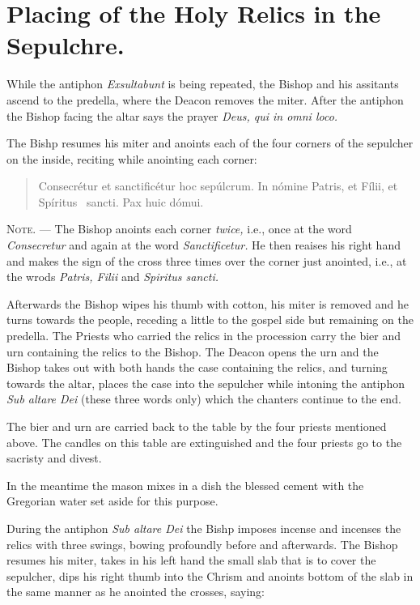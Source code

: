 \documentclass[letterpaper]{report}
\begin{document}
{\section{Placing of the Holy Relics in the Sepulchre.}

\rubric While the antiphon \textit{Exsultabunt} is being repeated, the Bishop
and his assitants ascend to the predella, where the Deacon removes the miter.
After the antiphon the Bishop facing the altar says the prayer \textit{Deus,
qui in omni loco.}

\rubric The Bishp resumes his miter and anoints each of the four corners of the
sepulcher on the inside, reciting while anointing each corner:

\begin{quote}
    Conse\cross crétur et sancti\cross ficétur hoc sepúlcrum. In nómine
    Pa\cross tris, et Fí\cross lii, et Spíritus \cross\ sancti. Pax huic dómui.
\end{quote}

\textsc{Note. ---} The Bishop anoints each corner \textit{twice,} i.e., once at
the word \textit{Consecretur} and again at the word \textit{Sanctificetur.} He
then reaises his right hand and makes the sign of the cross three times over
the corner just anointed, i.e., at the wrods \textit{Patris, Filii} and
\textit{Spiritus sancti.}

\rubric Afterwards the Bishop wipes his thumb with cotton, his miter is removed
and he turns towards the people, receding a little to the gospel side but
remaining on the predella. The Priests who carried the relics in the procession
carry the bier and urn containing the relics to the Bishop. The Deacon opens
the urn and the Bishop takes out with both hands the case containing the
relics, and turning towards the altar, places the case into the sepulcher while
intoning the antiphon \textit{Sub altare Dei} (these three words only) which
the chanters continue to the end.

The bier and urn are carried back to the table by the four priests mentioned
above. The candles on this table are extinguished and the four priests go to
the sacristy and divest.

In the meantime the mason mixes in a dish the blessed cement with the Gregorian
water set aside for this purpose.

\rubric During the antiphon \textit{Sub altare Dei} the Bishp imposes incense
and incenses the relics with three swings, bowing profoundly before and
afterwards. The Bishop resumes his miter, takes in his left hand the small slab
that is to cover the sepulcher, dips his right thumb into the Chrism and
anoints bottom of the slab in the same manner as he anointed the crosses,
saying:

}
\end{document}
